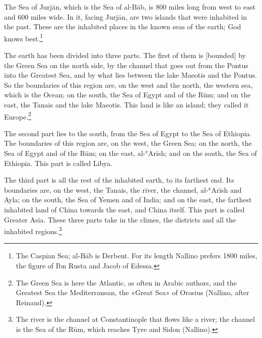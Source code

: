 \documentclass[11pt]{article}
\newcommand{\ArPage}[1]{\marginpar{\footnotesize\color{gray}Ar.\,p.\,#1}}
\begin{document}
\par The Sea of Jurjān, which is the Sea of al-Bāb, is 800 miles long from west to east and 600 miles wide. In it, facing Jurjān, are two islands that were inhabited in the past. These are the inhabited places in the known seas of the earth; God knows best.\footnote{The Caspian Sea; al-Bāb is Derbent. For its length Nallino prefers 1800 miles, the figure of Ibn Rusta and Jacob of Edessa.}\par
\par The earth has been divided into three parts. The first of them is [bounded] by the Green Sea on the north side, by the channel that goes out from the Pontus into the Greatest Sea, and by what lies between the lake Maeotis and the Pontus. So the boundaries of this region are, on the west and the north, the western sea, which is the Ocean; on the south, the Sea of Egypt and of the Rūm; and on the east, the Tanais and the lake Maeotis. This land is like an island; they called it Europe.\footnote{The Green Sea is here the Atlantic, as often in Arabic authors, and the Greatest Sea the Mediterranean, the «Great Sea» of Orosius (Nallino, after Reinaud).}\par
\par The second part lies to the south, from the Sea of Egypt to the Sea of Ethiopia. The boundaries of this region are, on the west, the Green Sea; on the north, the Sea of Egypt and of the Rūm; on the east, al-ʿArīsh; and on the south, the Sea of Ethiopia. This part is called Libya.\par
\par \ArPage{28}The third part is all the rest of the inhabited earth, to its farthest end. Its boundaries are, on the west, the Tanais, the river, the channel, al-ʿArīsh and Ayla; on the south, the Sea of Yemen and of India; and on the east, the farthest inhabited land of China towards the east, and China itself. This part is called Greater Asia. These three parts take in the climes, the districts and all the inhabited regions.\footnote{The river is the channel at Constantinople that flows like a river; the channel is the Sea of the Rūm, which reaches Tyre and Sidon (Nallino).}\par
\end{document}
